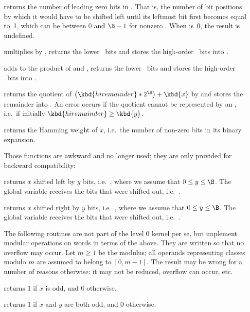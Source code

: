  returns the number of leading zero bits in .
That is, the number of bit positions by which it would have to be shifted
left until its leftmost bit first becomes equal to~1, which can be between 0
and $\B-1$ for nonzero . When  is~0, the result is undefined.

 multiplies  by , returns
the lower \B\ bits and stores the high-order \B\ bits into .

 adds  to the product
of  and , returns the lower \B\ bits and stores the high-order
\B\ bits into .

 returns the quotient of
$  \left(\kbd{hiremainder} * 2^{\B}\right) + \kbd{x} $
by  and stores the remainder into . An error occurs
if the quotient cannot be represented by an , i.e.~if initially
$\kbd{hiremainder}\ge\kbd{y}$.

 returns the Hamming weight of $x$, i.e.~the
number of non-zero bits in its binary expansion.

 Those functions are awkward and no longer used;
they are only provided for backward compatibility:

 returns $x$ shifted left by $y$ bits,
i.e.~, where we assume that $0\leq y\leq\B$. The global variable
 receives the bits that were shifted out,
i.e.~.

 returns $x$ shifted right by $y$ bits,
i.e.~, where we assume that $0\leq y\leq\B$. The global variable
 receives the bits that were shifted out,
i.e.~.

The following routines are not part of the level 0 kernel per se, but
implement modular operations on words in terms of the above. They are written
so that no overflow may occur. Let $m \geq 1$ be the modulus; all operands
representing classes modulo $m$ are assumed to belong to $[0,m-1]$. The
result may be wrong for a number of reasons otherwise: it may not be reduced,
overflow can occur, etc.

 returns 1 if $x$ is odd, and 0 otherwise.

 returns 1 if $x$ and $y$ are both odd,
and 0 otherwise.

